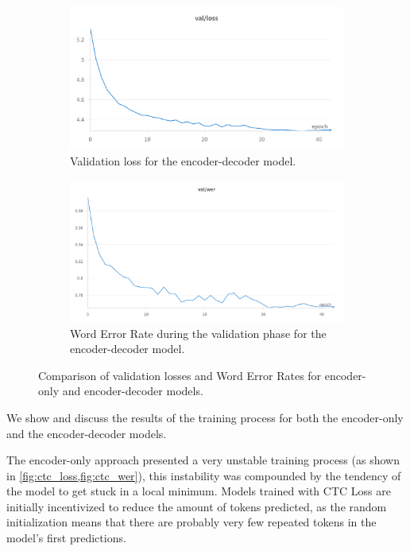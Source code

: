 \documentclass{IEEEtran}
\begin{document}
\begin{figure}[h]
    \begin{subfigure}[t]{0.45\textwidth}
        \centering
        \includegraphics[width=\textwidth]{figures/loss_encdec.png}
        \caption{Validation loss for the encoder-decoder model.}
        \label{fig:encdec_loss}
    \end{subfigure}
    \hfill
    \begin{subfigure}[t]{0.45\textwidth}
        \centering
        \includegraphics[width=\textwidth]{figures/wer_encdec.png}
        \caption{Word Error Rate during the validation phase for the encoder-decoder model.}
        \label{fig:encdec_wer}
    \end{subfigure}

    \caption{Comparison of validation losses and Word Error Rates for encoder-only and encoder-decoder models.}
    \label{fig:comparison}
\end{figure}


We show and discuss the results of the training process for both the encoder-only and the encoder-decoder models.

The encoder-only approach presented a very unstable training process (as shown in \cref{fig:ctc_loss,fig:ctc_wer}), this instability was compounded by the tendency of the model to get stuck in a local minimum. Models trained with CTC Loss are initially incentivized to reduce the amount of tokens predicted, as the random initialization means that there are probably very few repeated tokens in the model's first predictions. 
\end{document}

